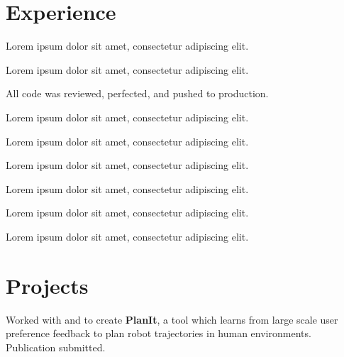 \documentclass[]{deedy-resume-openfont}
\begin{document}
\hfill
\begin{minipage}[t]{0.66\textwidth} 


\section{Experience}

\vspace{\topsep} %
\begin{tightemize}
\item Lorem ipsum dolor sit amet, consectetur adipiscing elit.
\item Lorem ipsum dolor sit amet, consectetur adipiscing elit.
\item All code was reviewed, perfected, and pushed to production.
\end{tightemize}
\sectionsep

\begin{tightemize}
\item Lorem ipsum dolor sit amet, consectetur adipiscing elit.
\item Lorem ipsum dolor sit amet, consectetur adipiscing elit.
\item Lorem ipsum dolor sit amet, consectetur adipiscing elit.

\end{tightemize}
\sectionsep

\begin{tightemize}
\item Lorem ipsum dolor sit amet, consectetur adipiscing elit.
\item Lorem ipsum dolor sit amet, consectetur adipiscing elit.
\item Lorem ipsum dolor sit amet, consectetur adipiscing elit.
\end{tightemize}
\sectionsep


\section{Projects}
Worked with and to create \textbf{PlanIt}, a tool which  learns from large scale user preference feedback to plan robot trajectories in human environments.  Publication submitted.
\sectionsep


\end{minipage}
\end{document}
